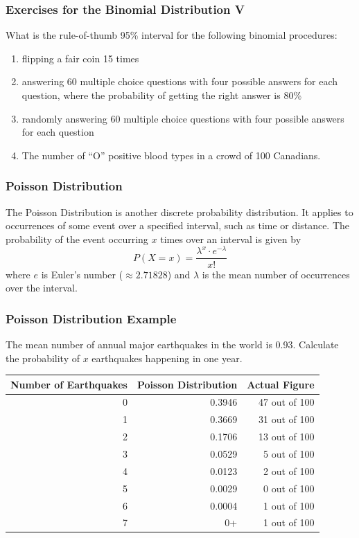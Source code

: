 \documentclass[xcolor=dvipsnames]{beamer}
\begin{document}
\begin{frame}
  \frametitle{Exercises for the Binomial Distribution V}
  {\ubung} What is the rule-of-thumb 95\% interval for the following
  binomial procedures:
  \begin{enumerate}
\item<1-> flipping a fair coin 15 times
\item<2-> answering 60 multiple choice questions with four possible
  answers for each question, where the probability of getting the right answer is 80\%
\item<3-> randomly answering 60 multiple choice questions with four
  possible answers for each question
\item<4-> The number of ``O'' positive blood types in a crowd of 100 Canadians.
  \end{enumerate}
\end{frame}

\begin{frame}
  \frametitle{Poisson Distribution}
The \alert{Poisson Distribution} is another discrete probability
distribution. It applies to occurrences of some event over a specified
interval, such as time or distance. The probability of the event
occurring $x$ times over an interval is given by
\begin{equation}
  \label{eq:zaengeit}
  P(X=x)=\frac{\lambda^{x}\cdot{}e^{-\lambda}}{x!}
\end{equation}
where $e$ is Euler's number ($\approx{}2.71828$) and $\lambda$ is the mean
number of occurrences over the interval.
\end{frame}

\begin{frame}
  \frametitle{Poisson Distribution Example}
 The mean number of annual major earthquakes
in the world is 0.93. Calculate the probability of $x$ earthquakes
happening in one year.

\medskip

\begin{tabular}{|r|r|r|}\hline
  Number of Earthquakes & Poisson Distribution & Actual Figure \\ \hline 
  0                     & 0.3946               & 47 out of 100 \\ \hline
  1                     & 0.3669               & 31 out of 100 \\ \hline
  2                     & 0.1706               & 13 out of 100 \\ \hline
  3                     & 0.0529               & 5 out of 100  \\ \hline
  4                     & 0.0123               & 2 out of 100  \\ \hline
  5                     & 0.0029               & 0 out of 100  \\ \hline
  6                     & 0.0004               & 1 out of 100  \\ \hline
  7                     & 0+                   & 1 out of 100  \\ \hline
\end{tabular}
\end{frame}
\end{document}
